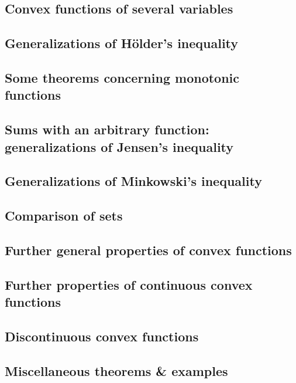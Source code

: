 \documentclass[oneside]{book}
\numberwithin{equation}{section}
\begin{document}
\subsection{Convex functions of several variables}

\subsection{Generalizations of H\"older's inequality}

\subsection{Some theorems concerning monotonic functions}

\subsection{Sums with an arbitrary function: generalizations of Jensen's inequality}

\subsection{Generalizations of Minkowski's inequality}

\subsection{Comparison of sets}

\subsection{Further general properties of convex functions}

\subsection{Further properties of continuous convex functions}

\subsection{Discontinuous convex functions}

\subsection{Miscellaneous theorems \& examples}

\end{document}
